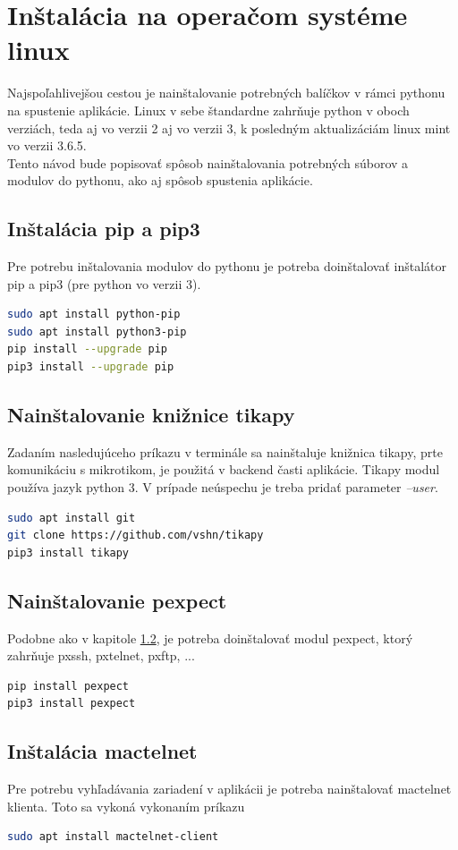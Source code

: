 \section{Inštalácia na operačom systéme linux}
Najspoľahlivejšou cestou je nainštalovanie potrebných balíčkov v rámci pythonu na spustenie aplikácie. Linux v sebe štandardne zahrňuje python v oboch verziách, teda aj vo verzii 2 aj vo verzii 3, k posledným aktualizáciám linux mint vo verzii 3.6.5. \\
Tento návod bude popisovať spôsob nainštalovania potrebných súborov a modulov do pythonu, ako aj spôsob spustenia aplikácie.
\subsection{Inštalácia pip a pip3}
Pre potrebu inštalovania modulov do pythonu je potreba doinštalovať inštalátor pip a pip3 (pre python vo verzii 3).
\begin{lstlisting}[language=bash, frame=single, caption=Nainštalovanie pip,captionpos=b, showstringspaces=false]
sudo apt install python-pip
sudo apt install python3-pip
pip install --upgrade pip
pip3 install --upgrade pip
\end{lstlisting}
\subsection{Nainštalovanie knižnice tikapy}
\label{sec:tikapy}
Zadaním nasledujúceho príkazu v terminále sa nainštaluje knižnica tikapy, prte komunikáciu s mikrotikom, je použitá v backend časti aplikácie. Tikapy modul používa jazyk python 3. V prípade neúspechu je treba pridať parameter \textit{--user}.
\begin{lstlisting}[language=bash, frame=single, caption=Nainštalovanie tikapy,captionpos=b, showstringspaces=false]
sudo apt install git
git clone https://github.com/vshn/tikapy
pip3 install tikapy
\end{lstlisting}
\subsection{Nainštalovanie pexpect}
Podobne ako v kapitole \ref{sec:tikapy}, je potreba doinštalovať modul pexpect, ktorý zahrňuje pxssh, pxtelnet, pxftp, ...
\begin{lstlisting}[language=bash, frame=single, caption=Nainštalovanie pexpect,captionpos=b, showstringspaces=false]
pip install pexpect
pip3 install pexpect
\end{lstlisting}
\subsection{Inštalácia mactelnet}
Pre potrebu vyhľadávania zariadení v aplikácii je potreba nainštalovať mactelnet klienta. Toto sa vykoná vykonaním príkazu
\begin{lstlisting}[language=bash, frame=single, caption=Nainštalovanie mactelnet,captionpos=b, showstringspaces=false]
sudo apt install mactelnet-client
\end{lstlisting}

